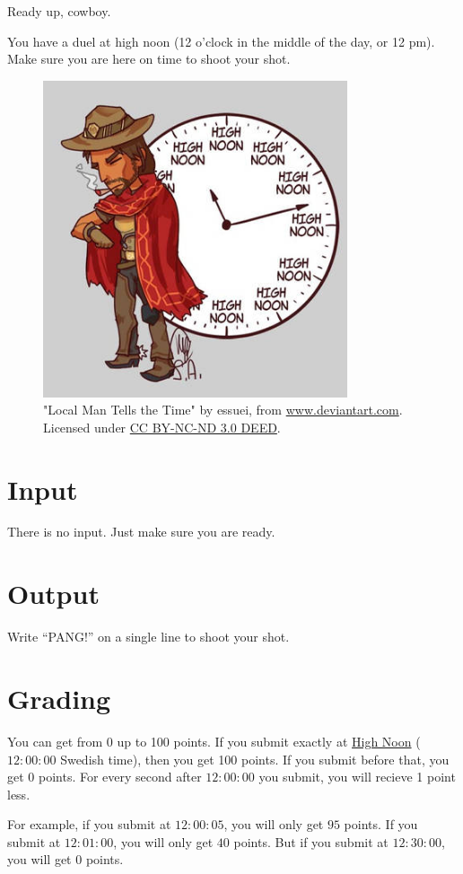 
Ready up, cowboy. 

You have a duel at high noon (12 o'clock in the middle of the day, or 12 pm). 
Make sure you are here on time to shoot your shot.

\begin{centering}
  \begin{figure}[h]
      \centering
      \includegraphics[width=0.8\textwidth]{highnoon.jpg}
      \caption{"Local Man Tells the Time" by essuei, from \href{https://www.deviantart.com/essuei/art/Overwatch-Local-Man-Tells-the-Time-614496598}{www.deviantart.com}. Licensed under \href{https://creativecommons.org/licenses/by-nc-nd/3.0/}{CC BY-NC-ND 3.0 DEED}.}
  \end{figure}
\end{centering}

\section*{Input}
There is no input. Just make sure you are ready.

\section*{Output}
Write ``PANG!'' on a single line to shoot your shot.

\section*{Grading}
You can get from 0 up to 100 points. If you submit exactly at \href{https://www.timeanddate.com/worldclock/fixedtime.html?msg=Ready+yourself%2C+Cowboy&iso=20240401T12&p1=239}{High Noon} 
($12:00:00$ Swedish time), then you get 100 points. If you submit before that, you get 0 points. For every second after $12:00:00$ you submit, you will recieve 1 point less. 

For example, if you submit at $12:00:05$, you will only get $95$ points. If you submit at $12:01:00$, you will only get $40$ points.
But if you submit at $12:30:00$, you will get $0$ points.


